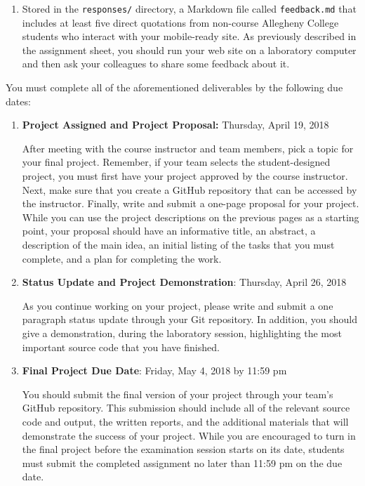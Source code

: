 \documentclass[11pt]{article}
\newcommand{\program}[1]{\lstinline{#1}}
\begin{document}
\begin{enumerate}
\item Stored in the \program{responses/} directory, a Markdown file called
  \program{feedback.md} that includes at least five direct quotations from
  non-course Allegheny College students who interact with your mobile-ready
  site. As previously described in the assignment sheet, you should run your web
  site on a laboratory computer and then ask your colleagues to share some
  feedback about it.

\end{enumerate}

\noindent
You must complete all of the aforementioned deliverables by the following due dates:

\begin{enumerate}

  \setlength{\itemsep}{0in}

  \item {\bf Project Assigned and Project Proposal:} Thursday, April 19, 2018

    After meeting with the course instructor and team members, pick a topic for
    your final project. Remember, if your team selects the student-designed
    project, you must first have your project approved by the course instructor.
    Next, make sure that you create a GitHub repository that can be accessed by
    the instructor. Finally, write and submit a one-page proposal for your
    project. While you can use the project descriptions on the previous pages as
    a starting point, your proposal should have an informative title, an
    abstract, a description of the main idea, an initial listing of the tasks
    that you must complete, and a plan for completing the work.

  \item {\bf Status Update and Project Demonstration}: Thursday, April 26, 2018

    As you continue working on your project, please write and submit a one
    paragraph status update through your Git repository. In addition, you should
    give a demonstration, during the laboratory session, highlighting the most
    important source code that you have finished.

  \item {\bf Final Project Due Date}: Friday, May 4, 2018 by 11:59 pm

    You should submit the final version of your project through your team's
    GitHub repository. This submission should include all of the relevant source
    code and output, the written reports, and the additional materials that will
    demonstrate the success of your project. While you are encouraged to turn in
    the final project before the examination session starts on its date,
    students must submit the completed assignment no later than 11:59 pm on the
    due date.

\end{enumerate}
\end{document}
